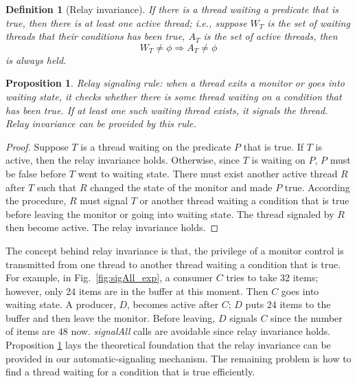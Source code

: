 \documentclass[preprint]{sigplanconf}
\newtheorem{definition}{Definition}
\newtheorem{proposition}{Proposition}
\begin{document}
\begin{definition}[Relay invariance]
    If there is a thread waiting a predicate that is true, then there is at
    least one active thread; i.e., suppose $W_T$ is the set of waiting threads
    that their conditions has been true, $A_T$ is the set of active threads,
    then
    \[
        W_T \ne \phi \Rightarrow A_T \ne \phi 
    \]
    is always held. 
\end{definition}
\begin{proposition} \label{pro:one}
    Relay signaling rule: when a thread exits a monitor or goes into waiting 
    state, it checks whether there is some thread waiting on a condition that 
    has been true. If at least one such waiting thread exists, it signals the 
    thread. Relay invariance can be provided by this rule. 
\end{proposition}
\begin{proof}
    Suppose $T$ is a thread waiting on the predicate $P$ that is true. If $T$ 
    is active, then the relay invariance holds. Otherwise, since $T$ is waiting 
    on $P$, $P$ must be false before $T$ went to waiting state. There must 
    exist another active thread $R$ after $T$ such that $R$ changed the state 
    of the monitor and made  $P$ true. According the procedure, $R$ must signal
    $T$ or another thread waiting a condition that is true before leaving the
    monitor or going into waiting state. The thread signaled by $R$ then become 
    active. The relay invariance holds. 
 
 \end{proof}

The concept behind relay invariance is that, the privilege of a monitor control
is transmitted from one thread to another thread waiting a condition that is
true. For example, in Fig.~\ref{fig:sigAll_exp}, a consumer $C$ tries to take
$32$ items; however, only $24$ items are in the buffer at this moment. Then $C$
goes into waiting state. A producer, $D$, becomes active after $C$; $D$ puts
$24$ items to the buffer and then leave the monitor. Before leaving, $D$
signals $C$ since the number of items are $48$ now. 
{\it signalAll} calls are avoidable since relay invariance holds. 
Proposition \ref{pro:one} lays the theoretical foundation that the relay
invariance can be provided in our automatic-signaling mechanism. 
The remaining problem is how to find a thread waiting for a condition that is 
true efficiently. 
\end{document}
